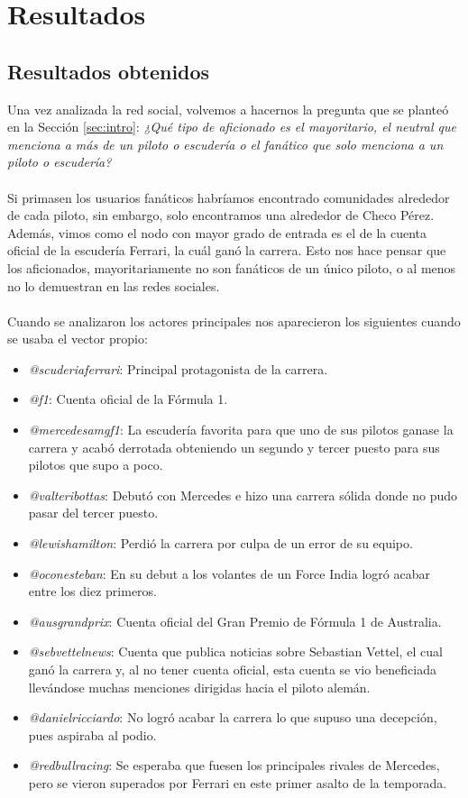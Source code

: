 \section{Resultados}

\subsection{Resultados obtenidos}

Una vez analizada la red social, volvemos a hacernos la pregunta que se planteó en la Sección \ref{sec:intro}: \textit{¿Qué tipo de aficionado es el mayoritario, el neutral que menciona a más de un piloto o escudería o el fanático que solo menciona a un piloto o escudería?}
\\ \\
Si primasen los usuarios fanáticos habríamos encontrado comunidades alrededor de cada piloto, sin embargo, solo encontramos una alrededor de Checo Pérez. Además, vimos como el nodo con mayor grado de entrada es el de la cuenta oficial de la escudería Ferrari, la cuál ganó la carrera. Esto nos hace pensar que los aficionados, mayoritariamente no son fanáticos de un único piloto, o al menos no lo demuestran en las redes sociales.
\\ \\
Cuando se analizaron los actores principales nos aparecieron los siguientes cuando se usaba el vector propio:

\begin{itemize}
	\item \textit{@scuderiaferrari}: Principal protagonista de la carrera.
	\item \textit{@f1}: Cuenta oficial de la Fórmula 1.
	\item \textit{@mercedesamgf1}: La escudería favorita para que uno de sus pilotos ganase la carrera y acabó derrotada obteniendo un segundo y tercer puesto para sus pilotos que supo a poco.
	\item \textit{@valteribottas}: Debutó con Mercedes e hizo una carrera sólida donde no pudo pasar del tercer puesto.
	\item \textit{@lewishamilton}: Perdió la carrera por culpa de un error de su equipo.
	\item \textit{@oconesteban}: En su debut a los volantes de un Force India logró acabar entre los diez primeros.
	\item \textit{@ausgrandprix}: Cuenta oficial del Gran Premio de Fórmula 1 de Australia.
	\item \textit{@sebvettelnews}: Cuenta que publica noticias sobre Sebastian Vettel, el cual ganó la carrera y, al no tener cuenta oficial, esta cuenta se vio beneficiada llevándose muchas menciones dirigidas hacia el piloto alemán.
	\item \textit{@danielricciardo}: No logró acabar la carrera lo que supuso una decepción, pues aspiraba al podio.
	\item \textit{@redbullracing}: Se esperaba que fuesen los principales rivales de Mercedes, pero se vieron superados por Ferrari en este primer asalto de la temporada.
\end{itemize}

